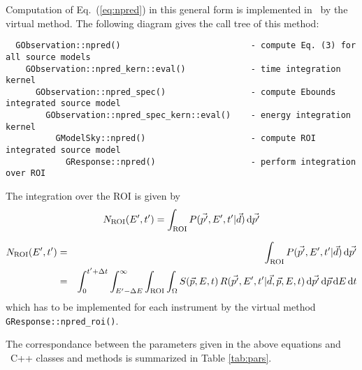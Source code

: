 \documentclass{article}[12pt,a4]
\begin{document}
Computation of Eq.~(\ref{eq:npred}) in this general form is implemented in \this\ by the 
virtual method.
The following diagram gives the call tree of this method:
\begin{verbatim}
  GObservation::npred()                          - compute Eq. (3) for all source models
    GObservation::npred_kern::eval()             - time integration kernel
      GObservation::npred_spec()                 - compute Ebounds integrated source model
        GObservation::npred_spec_kern::eval()    - energy integration kernel
          GModelSky::npred()                     - compute ROI integrated source model
            GResponse::npred()                   - perform integration over ROI
\end{verbatim}
The integration over the ROI is given by
\begin{equation}
N_{\rm ROI}(E', t') = \int_{\rm ROI} P(\vec{p'}, E', t' | \vec{d}) \, {\rm d}\vec{p'}
\label{eq:nroi}
\end{equation}

\begin{eqnarray}
N_{\rm ROI}(E', t') & = & \int_{\rm ROI} P(\vec{p'}, E', t' | \vec{d}) \, {\rm d}\vec{p'} \\
& = & \int_{0}^{t'+\Delta t} \int_{E'-\Delta E}^{\infty} \int_{\rm ROI} \int_{\Omega} 
  S(\vec{p}, E, t) \, R(\vec{p'}, E', t' | \vec{d}, \vec{p}, E, t) \, {\rm d}\vec{p'} \, {\rm d}\vec{p} \, {\rm d}E \,{\rm d}t
\end{eqnarray}
which has to be implemented for each instrument by the virtual method
{\tt GResponse::npred\_roi()}.

The correspondance between the parameters given in the above equations and
\this\ C++ classes and methods is summarized in Table \ref{tab:pars}.
\end{document}
